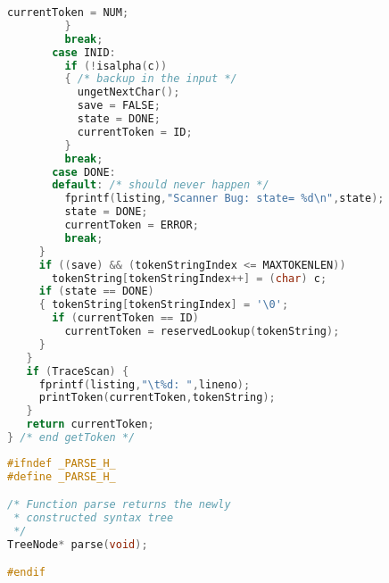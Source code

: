 \documentclass[lang=cn,10pt]{elegantbook}
\begin{document}
\begin{lstlisting}[caption={scan.c},language=c]
           currentToken = NUM;
         }
         break;
       case INID:
         if (!isalpha(c))
         { /* backup in the input */
           ungetNextChar();
           save = FALSE;
           state = DONE;
           currentToken = ID;
         }
         break;
       case DONE:
       default: /* should never happen */
         fprintf(listing,"Scanner Bug: state= %d\n",state);
         state = DONE;
         currentToken = ERROR;
         break;
     }
     if ((save) && (tokenStringIndex <= MAXTOKENLEN))
       tokenString[tokenStringIndex++] = (char) c;
     if (state == DONE)
     { tokenString[tokenStringIndex] = '\0';
       if (currentToken == ID)
         currentToken = reservedLookup(tokenString);
     }
   }
   if (TraceScan) {
     fprintf(listing,"\t%d: ",lineno);
     printToken(currentToken,tokenString);
   }
   return currentToken;
} /* end getToken */
\end{lstlisting}

\begin{lstlisting}[caption={parse.h},language=c]
#ifndef _PARSE_H_
#define _PARSE_H_

/* Function parse returns the newly 
 * constructed syntax tree
 */
TreeNode* parse(void);

#endif
\end{lstlisting}
\end{document}
